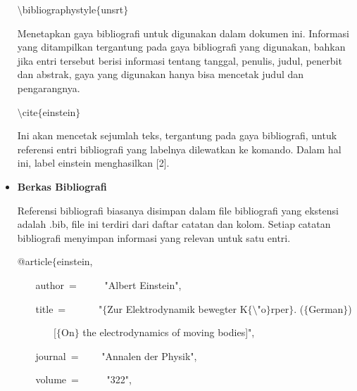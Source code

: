 \begin{itemize}
$\setminus$bibliographystyle$ \{ $unsrt$ \} $\par
\vspace{\baselineskip}
Menetapkan gaya bibliografi untuk digunakan dalam dokumen ini. Informasi yang ditampilkan tergantung pada gaya bibliografi yang digunakan, bahkan jika entri tersebut berisi informasi tentang tanggal, penulis, judul, penerbit dan abstrak, gaya yang digunakan hanya bisa mencetak judul dan pengarangnya.\par
\vspace{\baselineskip}
$\setminus$cite$ \{ $einstein$ \} $\par
\vspace{\baselineskip}
Ini akan mencetak sejumlah teks, tergantung pada gaya bibliografi, untuk referensi entri bibliografi yang labelnya dilewatkan ke komando. Dalam hal ini, label einstein menghasilkan [2].\par
\vspace{\baselineskip}

	\item {\fontsize{14pt}{14pt}\selectfont \textbf{Berkas Bibliografi}}\par
\vspace{\baselineskip}
Referensi bibliografi biasanya disimpan dalam file bibliografi yang ekstensi adalah .bib, file ini terdiri dari daftar catatan dan kolom. Setiap catatan bibliografi menyimpan informasi yang relevan untuk satu entri.\par

\hspace*{0.5in}\hspace*{0.5in}@article$ \{ $einstein,\par

~~~ \hspace*{0.5in}author~=~~~~~  "Albert Einstein",\par

~~~ \hspace*{0.5in}title~=~~~~~~  "$ \{ $Zur Elektrodynamik bewegter K$ \{ $$\setminus$"o$ \} $rper$ \} $. ($ \{ $German$ \} $)\par

~~~ \hspace*{0.5in}~~~ [$ \{ $On$ \} $ the electrodynamics of moving bodies]",\par

~~~ \hspace*{0.5in}journal~=~~~~  "Annalen der Physik",\par

~~~ \hspace*{0.5in}volume~=~~~~~  "322",\par


\end{itemize}
